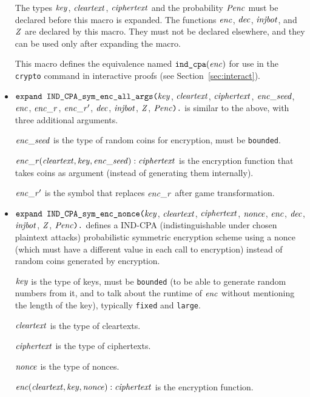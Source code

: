 \documentclass{article}
\begin{document}
\begin{itemize}
   The types $\mathit{key}$, $\mathit{cleartext}$,
   $\mathit{ciphertext}$ and the probability $\mathit{Penc}$ must
   be declared before this macro is expanded. The functions
   $\mathit{enc}$, $\mathit{dec}$, $\mathit{injbot}$, and $\mathit{Z}$ are declared by this
   macro. They must not be declared elsewhere, and they can be used
   only after expanding the macro.

   This macro defines the equivalence named $\texttt{ind\_cpa}(\mathit{enc})$
   for use in the \texttt{crypto} command in interactive proofs
   (see Section~\ref{sec:interact}).

\item $\texttt{expand IND\_CPA\_sym\_enc\_all\_args(}\mathit{key}$,
  $\mathit{cleartext}$, $\mathit{ciphertext}$, $\mathit{enc\_seed}$, $\mathit{enc}$, $\mathit{enc\_r}$, $\mathit{enc\_r}'$,
  $\mathit{dec}$, $\mathit{injbot}$, $\mathit{Z}$, $\mathit{Penc}\texttt{).}$ is similar to the above,
  with three additional arguments. 

  $\mathit{enc\_seed}$ is the type of random coins for encryption, must be \texttt{bounded}.

  $\mathit{enc\_r}(\mathit{cleartext}, \mathit{key}, \mathit{enc\_seed}): \mathit{ciphertext}$ is the encryption function that takes coins as argument (instead of generating them internally).

  $\mathit{enc\_r}'$ is the symbol that replaces $\mathit{enc\_r}$ after game transformation.

\item $\texttt{expand IND\_CPA\_sym\_enc\_nonce(}\mathit{key}$,
  $\mathit{cleartext}$, $\mathit{ciphertext}$, $\mathit{nonce}$, $\mathit{enc}$,
  $\mathit{dec}$, $\mathit{injbot}$, $\mathit{Z}$, $\mathit{Penc}\texttt{).}$ defines a
  IND-CPA (indistinguishable under chosen plaintext attacks)
  probabilistic symmetric encryption scheme using a nonce 
   (which must have a different value in each call to encryption)
   instead of random coins generated by encryption.

   $\mathit{key}$ is the type of keys, must be \texttt{bounded} (to be able to generate random numbers from it, and to talk about the runtime of $\mathit{enc}$ without mentioning the length of the key), typically \texttt{fixed} and \texttt{large}.

   $\mathit{cleartext}$ is the type of cleartexts.

   $\mathit{ciphertext}$ is the type of ciphertexts.

   $\mathit{nonce}$ is the type of nonces.

   $\mathit{enc}(\mathit{cleartext}, \mathit{key}, \mathit{nonce}): \mathit{ciphertext}$ is the encryption function. 


\end{itemize}
\end{document}
